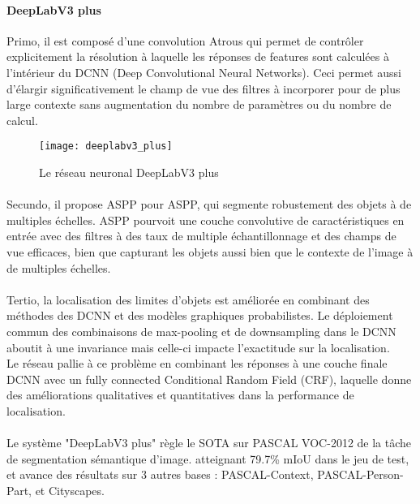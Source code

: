 \documentclass[
10pt, %
a4paper, %
oneside, %
headinclude,footinclude, %
]{scrartcl}
\begin{document}
\paragraph{DeepLabV3 plus}
Primo, il est composé d’une convolution Atrous\cite{deeplabv3plus2018} qui permet de contrôler explicitement la résolution à laquelle les réponses de features sont calculées à l’intérieur du \gls{DCNN} (Deep Convolutional Neural Networks). Ceci permet aussi d’élargir significativement le champ de vue des filtres à incorporer pour de plus large contexte sans augmentation du nombre de paramètres ou du nombre de calcul.
\begin{figure}[htb]
\centering 
\texttt{[image: deeplabv3\_plus]} 
\caption[DeepLabV3 plus]{Le réseau neuronal DeepLabV3 plus} %
\label{fig:deeplabv3_plus} 
\end{figure}
\paragraph{}Secundo, il propose ASPP pour \gls{ASPP}, qui segmente robustement des objets à de multiples échelles. ASPP pourvoit une couche convolutive de caractéristiques en entrée avec des filtres à des taux de multiple échantillonnage et des champs de vue efficaces, bien que capturant les objets aussi bien que le contexte de l’image à de multiples échelles.

\paragraph{}Tertio, la localisation des limites d’objets est améliorée en combinant des méthodes des DCNN et des modèles graphiques probabilistes. Le déploiement commun des combinaisons de max-pooling et de downsampling dans le DCNN aboutit à une invariance mais celle-ci impacte l’exactitude sur la localisation.
\\
Le réseau pallie à ce problème en combinant les réponses à une couche finale DCNN avec un fully connected Conditional Random Field (CRF), laquelle donne des améliorations qualitatives et quantitatives dans la performance de localisation.

\paragraph{}Le système "DeepLabV3 plus" règle le SOTA sur PASCAL VOC-2012 de la tâche de segmentation sémantique d’image. atteignant 79.7\% mIoU dans le jeu de test, et avance des résultats  sur 3 autres bases : PASCAL-Context, PASCAL-Person-Part, et Cityscapes.
\end{document}
